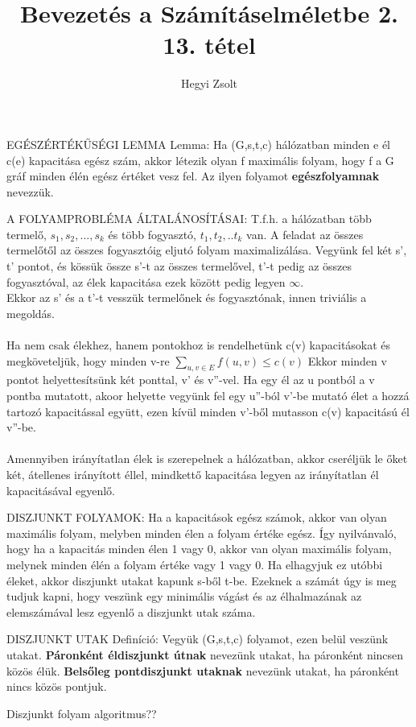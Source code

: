 \documentclass[]{article}
\title{Bevezetés a Számításelméletbe 2.\\{\large 13. tétel}}
\author{Hegyi Zsolt}
\begin{document}
\maketitle
\begin{framed}
EGÉSZÉRTÉKŰSÉGI LEMMA Lemma: Ha (G,s,t,c) hálózatban minden e él c(e) kapacitása egész szám, akkor létezik olyan f maximális folyam, hogy f a G gráf minden élén egész értéket vesz fel. Az ilyen folyamot \textbf{egészfolyamnak} nevezzük.
\end{framed}
\begin{framed}
A FOLYAMPROBLÉMA ÁLTALÁNOSÍTÁSAI: T.f.h. a hálózatban több termelő, $s_1, s_2,...,s_k$ és több fogyasztó, $t_1, t_2,..t_k$ van. A feladat az összes termelőtől az összes fogyasztóig eljutó folyam maximalizálása. Vegyünk fel két s', t' pontot, és kössük össze s'-t az összes termelővel, t'-t pedig az összes fogyasztóval, az élek kapacitása ezek között pedig legyen $\infty$.
\\
Ekkor az s' és a t'-t vesszük termelőnek és fogyasztónak, innen triviális a megoldás.
\\
\\
Ha nem csak élekhez, hanem pontokhoz is rendelhetünk c(v) kapacitásokat és megköveteljük, hogy minden v-re
$\sum_{u,v\in E}^{} f(u,v) \leq c(v)$
Ekkor minden v pontot helyettesítsünk két ponttal, v' és v''-vel. Ha egy él az u pontból a v pontba mutatott, akoor helyette vegyünk fel egy u''-ból v'-be mutató élet a hozzá tartozó kapacitással együtt, ezen kívül minden v'-ből mutasson c(v) kapacitású él v''-be.
\\
\\
Amennyiben irányítatlan élek is szerepelnek a hálózatban, akkor cseréljük le őket két, átellenes irányított éllel, mindkettő kapacitása legyen az irányítatlan él kapacitásával egyenlő.
\end{framed}
\begin{framed}
DISZJUNKT FOLYAMOK: Ha a kapacitások egész számok, akkor van olyan maximális folyam, melyben minden élen a folyam értéke egész. Így nyilvánvaló, hogy ha a kapacitás minden élen 1 vagy 0, akkor van olyan maximális folyam, melynek minden élén a folyam értéke vagy 1 vagy 0. Ha elhagyjuk ez utóbbi éleket, akkor diszjunkt utakat kapunk s-ből t-be. Ezeknek a számát úgy is meg tudjuk kapni, hogy veszünk egy minimális vágást és az élhalmazának az elemszámával lesz egyenlő a diszjunkt utak száma.
\end{framed}
\begin{shaded}
DISZJUNKT UTAK Definíció: Vegyük (G,s,t,c) folyamot, ezen belül veszünk utakat. \textbf{Páronként éldiszjunkt útnak} nevezünk utakat, ha páronként nincsen közös élük. \textbf{Belsőleg pontdiszjunkt utaknak} nevezünk utakat, ha páronként nincs közös pontjuk.
\end{shaded}
Diszjunkt folyam algoritmus??
\end{document}
